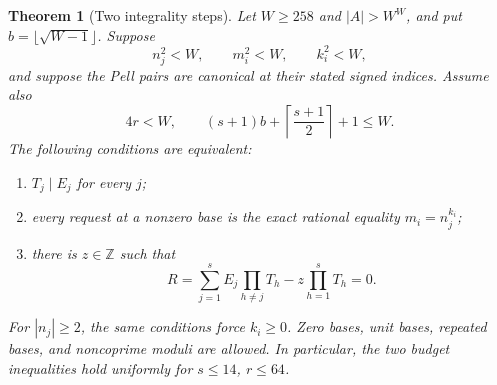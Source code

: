 \documentclass[10pt,letterpaper]{article}
\newtheorem{theorem}{Theorem}[section]
\theoremstyle{remark}\newtheorem{remark}[theorem]{Remark}
\newcommand{\Z}{\mathbb Z}\newcommand{\Q}{\mathbb Q}\newcommand{\N}{\mathbb N}
\begin{document}
\begin{theorem}[Two integrality steps]\label{thm:main}
Let $W\ge258$ and $|A|>W^W$, and put
$b=\lfloor\sqrt{W-1}\rfloor$. Suppose
\[
 n_j^2<W,\qquad m_i^2<W,\qquad k_i^2<W,
\]
and suppose the Pell pairs are canonical at their stated signed indices.
Assume also
\begin{equation}
 4r<W,\qquad
 (s+1)b+\left\lceil\frac{s+1}{2}\right\rceil+1\le W.
 \label{eq:budget}
\end{equation}
The following conditions are equivalent:
\begin{enumerate}
\item $T_j\mid E_j$ for every $j$;
\item every request at a nonzero base is the exact rational equality
      $m_i=n_j^{k_i}$;
\item there is $z\in\Z$ such that
\begin{equation}
 \boxed{\quad
 R=\sum_{j=1}^{s}E_j\prod_{h\ne j}T_h
       -z\prod_{h=1}^{s}T_h=0.\quad}\label{eq:pooled}
\end{equation}
\end{enumerate}
For $|n_j|\ge2$, the same conditions force $k_i\ge0$.
Zero bases, unit bases, repeated bases, and noncoprime moduli are allowed.
In particular, the two budget inequalities hold uniformly for $s\le14$, $r\le64$.
\end{theorem}
\end{document}
